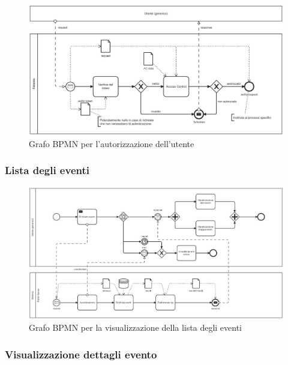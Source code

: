 \documentclass{article}
\begin{document}
\begin{figure}[htbp]
    \label{7.1.2}
    \centering
    \includegraphics[width=1\textwidth]{Images/BPMN - authz.png}
    \caption{Grafo BPMN per l'autorizzazione dell'utente}
\end{figure}

\clearpage

\subsubsection{Lista degli eventi}

\begin{figure}[htbp]
    \label{7.1.3}
    \centering
    \includegraphics[width=1\textwidth]{Images/BPMN - list.png}
    \caption{Grafo BPMN per la visualizzazione della lista degli eventi}
\end{figure}

\clearpage

\subsubsection{Visualizzazione dettagli evento}
\end{document}
